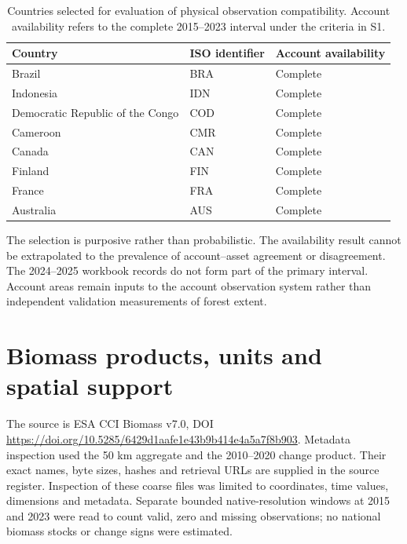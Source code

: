 \documentclass[11pt,a4paper]{article}
\begin{document}
\begin{table}[htbp]
\centering\small
\caption{Countries selected for evaluation of physical observation compatibility. Account availability refers to the complete 2015--2023 interval under the criteria in S1.}\label{tab:countries}
\begin{tabular}{lll}
\toprule
Country & ISO identifier & Account availability\\\midrule
Brazil & BRA & Complete\\
Indonesia & IDN & Complete\\
Democratic Republic of the Congo & COD & Complete\\
Cameroon & CMR & Complete\\
Canada & CAN & Complete\\
Finland & FIN & Complete\\
France & FRA & Complete\\
Australia & AUS & Complete\\\bottomrule
\end{tabular}
\end{table}

The selection is purposive rather than probabilistic. The availability result cannot be extrapolated to the prevalence of account--asset agreement or disagreement. The 2024--2025 workbook records do not form part of the primary interval. Account areas remain inputs to the account observation system rather than independent validation measurements of forest extent.

\section{Biomass products, units and spatial support}

The source is ESA CCI Biomass v7.0, DOI \url{https://doi.org/10.5285/6429d1aafe1e43b9b414e4a5a7f8b903}. Metadata inspection used the 50 km aggregate and the 2010--2020 change product. Their exact names, byte sizes, hashes and retrieval URLs are supplied in the source register. Inspection of these coarse files was limited to coordinates, time values, dimensions and metadata. Separate bounded native-resolution windows at 2015 and 2023 were read to count valid, zero and missing observations; no national biomass stocks or change signs were estimated.
\end{document}
